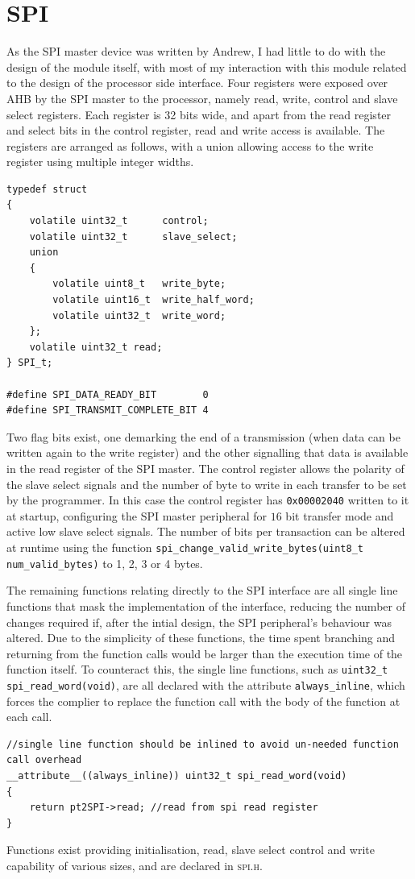 \documentclass[11pt,british]{report}
\begin{document}
\section*{SPI}
As the SPI master device was written by Andrew, I had little to do with the design of the module itself, with most of my interaction with this module related to the design of the processor side interface. Four registers were exposed over AHB by the SPI master to the processor, namely read, write, control and slave select registers. Each register is 32 bits wide, and apart from the read register and select bits in the control register, read and write access is available. The registers are arranged as follows, with a union allowing access to the write register using multiple integer widths.
\begin{lstlisting}[style={c-style}]
typedef struct
{
	volatile uint32_t      control;
	volatile uint32_t      slave_select;
	union
	{
		volatile uint8_t   write_byte;
		volatile uint16_t  write_half_word;
		volatile uint32_t  write_word;
	};
	volatile uint32_t read;
} SPI_t;

#define SPI_DATA_READY_BIT        0
#define SPI_TRANSMIT_COMPLETE_BIT 4
\end{lstlisting}

Two flag bits exist, one demarking the end of a transmission (when data can be written again to the write register) and the other signalling that data is available in the read register of the SPI master. The control register allows the polarity of the slave select signals and the number of byte to write in each transfer to be set by the programmer. In this case the control register has \texttt{0x00002040} written to it at startup, configuring the SPI master peripheral for $16$ bit transfer mode and active low slave select signals. The number of bits per transaction can be altered at runtime using the function \lstinline[style={c-style}]|spi_change_valid_write_bytes(uint8_t num_valid_bytes)| to 1, 2, 3 or 4 bytes.

The remaining functions relating directly to the SPI interface are all single line functions that mask the implementation of the interface, reducing the number of changes required if, after the intial design, the SPI peripheral's behaviour was altered. Due to the simplicity of these functions, the time spent branching and returning from the function calls would be larger than the execution time of the function itself. To counteract this, the single line functions, such as \lstinline[style={c-style}]|uint32_t spi_read_word(void)|, are all declared with the attribute \texttt{always\_inline}, which forces the complier to replace the function call with the body of the function at each call.
\begin{lstlisting}[style={c-style}]
//single line function should be inlined to avoid un-needed function call overhead
__attribute__((always_inline)) uint32_t spi_read_word(void)
{
	return pt2SPI->read; //read from spi read register
}
\end{lstlisting}
Functions exist providing initialisation, read, slave select control and write capability of various sizes, and are declared in \textsc{spi.h}.
\end{document}
